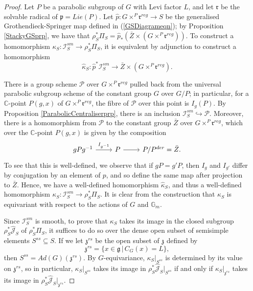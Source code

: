\documentclass[10pt,a4paper]{amsart}
\begin{document}
\begin{proof} 
Let $P$ be a parabolic subgroup of $G$ with Levi factor $L$, and let $\mathfrak{r}$ be the solvable radical of $\mathfrak{p} = Lie(P)$. Let $\hat{p}:G \times^P\mathfrak{r}^{reg} \rightarrow S$ be the generalised Grothendieck-Springer map defined in (\ref{GSDiagrameqn}); by Proposition \ref{StackyGSprp}, we have that $\rho_S^* \Pi_S = \hat{p}_*(\bar{Z} \times (G \times^P \mathfrak{r}^{reg}))$. To construct a homomorphism $\kappa_S:\mathcal I^{sm}_S \rightarrow \mathcal \rho_S^*\Pi_S$, it is equivalent by adjunction to construct a homomorphism
\begin{equation}\label{CameralHomLifteqn}
    \hat{\kappa}_S:\hat{p}^*\mathcal I^{sm}_S \rightarrow \bar{Z} \times (G \times^P \mathfrak{r}^{reg}).
\end{equation}

There is a group scheme $\mathcal P$ over $G \times^P \mathfrak{r}^{reg}$ pulled back from the universal parabolic subgroup scheme of the constant group $G$ over $G/P$; in particular, for a $\mathbb{C}$-point $P(g,x)$ of $G \times^P \mathfrak{r}^{reg}$, the fibre of $\mathcal P$ over this point is $I_g(P)$. By Proposition \ref{ParabolicCentraliserprp}, there is an inclusion $\mathcal I_S^{sm} \hookrightarrow \mathcal P$. Moreover, there is a homomorphism from $\mathcal P$ to the constant group $\bar{Z}$ over $G \times^P \mathfrak{r}^{reg}$, which over the $\mathbb{C}$-point $P(g,x)$ is given by the composition
\begin{equation}\label{CameralHom1eqn}
\begin{tikzcd}
gPg^{-1} \arrow[r, "I_{g^{-1}}"] & P \arrow[r] & P/P^{der} = \bar{Z}. 
\end{tikzcd}
\end{equation}
To see that this is well-defined, we observe that if $gP = g'P$, then $I_g$ and $I_{g'}$ differ by conjugation by an element of $p$, and so define the same map after projection to $\bar{Z}$. Hence, we have a well-defined homomorphism $\hat{\kappa}_S$, and thus a well-defined homomorphism $\kappa_S:\mathcal I^{sm}_S \rightarrow \rho_S^*\Pi_S$. It is clear from the construction that $\kappa_S$ is equivariant with respect to the actions of $G$ and $\mathbb{G}_m$.

Since $\mathcal I_S^{sm}$ is smooth, to prove that $\kappa_S$ takes its image in the closed subgroup $\rho_S^* \hat{\mathcal J}_S$ of $\rho_S^*\Pi_S$, it suffices to do so over the dense open subset of semisimple elements $S^{ss} \subseteq S$. If we let $\mathfrak{z}^{rs}$ be the open subset of $\mathfrak{z}$ defined by
\begin{equation}\label{WeylLeviActioneqn}
    \mathfrak{z}^{rs} = \{ x \in \mathfrak{g} \, | \,C_G(x) = L \},
\end{equation}
then $S^{ss} = Ad(G)(\mathfrak{z}^{rs})$. By $G$-equivariance, $\kappa_S|_{S^{ss}}$ is determined by its value on $\mathfrak{z}^{rs}$, so in particular, $\kappa_S|_{S^{ss}}$ takes its image in $\rho_S^* \hat{\mathcal J}_S|_{S^{ss}}$ if and only if $\kappa_S|_{\mathfrak{z}^{rs}}$ takes its image in $\rho_S^* \hat{\mathcal J}_S|_{\mathfrak{z}^{rs}}$. 


\end{proof}
\end{document}
